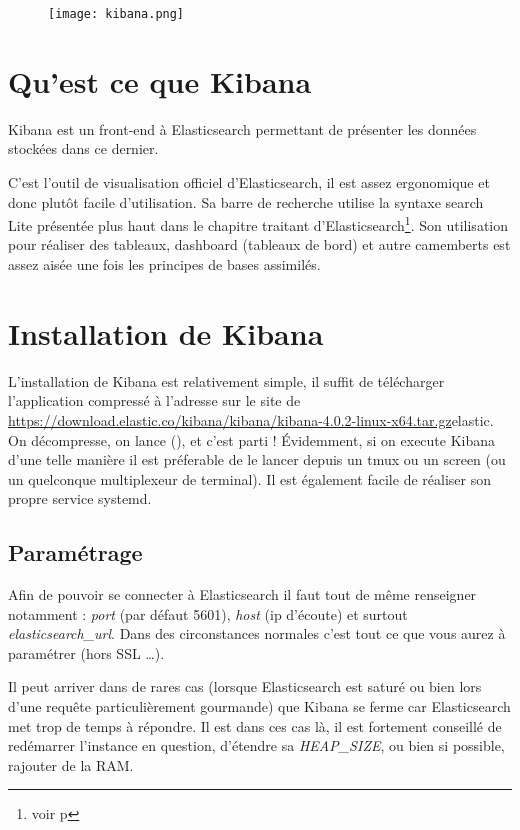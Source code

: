 \begin{figure}[H]
\center
\texttt{[image: kibana.png]}
\label{fig:kibana.png}
\end{figure}
\section{Qu'est ce que Kibana}
Kibana est un front-end à Elasticsearch permettant de présenter les données stockées dans ce dernier. 

C'est l'outil de visualisation officiel d'Elasticsearch, il est assez ergonomique 
et donc plutôt facile d'utilisation. Sa barre de recherche utilise la syntaxe 
search Lite présentée plus haut dans le chapitre traitant d'Elasticsearch\footnote{voir p\pageref{subsec:elasticsearchlite}}.
Son utilisation pour réaliser des tableaux, dashboard (tableaux de bord) et autre 
camemberts est assez aisée une fois les principes de bases assimilés.



\section{Installation de Kibana}
L'installation de Kibana est relativement simple, il suffit de télécharger l'application
compressé à l'adresse sur le site de \url{https://download.elastic.co/kibana/kibana/kibana-4.0.2-linux-x64.tar.gz}{elastic}.
On décompresse, on lance (), et c'est parti !
Évidemment, si on execute Kibana d'une telle manière il est préferable de le lancer
depuis un tmux ou un screen (ou un quelconque multiplexeur de terminal). Il est 
également facile de réaliser son propre service systemd.

\subsection{Paramétrage}
Afin de pouvoir se connecter à Elasticsearch il faut tout de même renseigner\\
 notamment : \emph{port} (par défaut 5601), \emph{host} (ip d'écoute)
et surtout \emph{elasticsearch\_url}.
Dans des circonstances normales c'est tout ce que vous aurez à paramétrer (hors 
SSL \ldots{}).

Il peut arriver dans de rares cas (lorsque Elasticsearch est saturé ou bien lors 
d'une requête particulièrement gourmande) que Kibana se ferme car Elasticsearch met
trop de temps à répondre. Il est dans ces cas là, il est fortement conseillé de 
redémarrer l'instance en question, d'étendre sa \emph{HEAP\_SIZE}, ou bien si possible, 
rajouter de la RAM.

